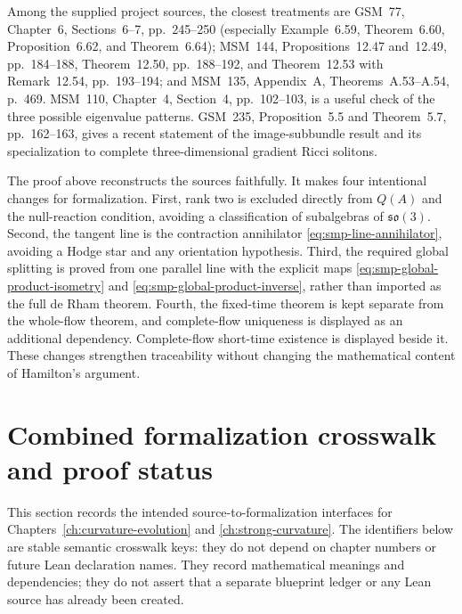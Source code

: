 \documentclass[10pt]{coll-l}
\theoremstyle{definition}
\theoremstyle{remark}
\numberwithin{section}{chapter}
\numberwithin{equation}{chapter}
\begin{document}
Among the supplied project sources, the closest treatments are GSM~77,
Chapter~6, Sections~6--7, pp.~245--250 (especially Example~6.59,
Theorem~6.60, Proposition~6.62, and Theorem~6.64); MSM~144,
Propositions~12.47 and~12.49, pp.~184--188, Theorem~12.50,
pp.~188--192, and Theorem~12.53 with Remark~12.54, pp.~193--194; and
MSM~135, Appendix~A, Theorems~A.53--A.54, p.~469.  MSM~110,
Chapter~4, Section~4, pp.~102--103, is a useful check of the three possible
eigenvalue patterns.  GSM~235, Proposition~5.5 and Theorem~5.7,
pp.~162--163, gives a recent statement of the image-subbundle result and its
specialization to complete three-dimensional gradient Ricci solitons.

The proof above reconstructs the sources faithfully.  It makes four
intentional changes for formalization.  First, rank two is excluded directly from
$Q(A)$ and the null-reaction condition, avoiding a classification of
subalgebras of $\mathfrak{so}(3)$.  Second, the tangent line is the
contraction annihilator \eqref{eq:smp-line-annihilator}, avoiding a Hodge
star and any orientation hypothesis.  Third, the required global splitting
is proved from one parallel line with the explicit maps
\eqref{eq:smp-global-product-isometry} and
\eqref{eq:smp-global-product-inverse}, rather than imported as the full de
Rham theorem.  Fourth, the fixed-time theorem is kept separate from the
whole-flow theorem, and complete-flow uniqueness is displayed as an
additional dependency.  Complete-flow short-time existence is displayed
beside it.  These changes strengthen traceability without
changing the mathematical content of Hamilton's argument.

\section{Combined formalization crosswalk and proof status}
\label{sec:strong-curvature-formalization}

This section records the intended source-to-formalization interfaces for
Chapters~\ref{ch:curvature-evolution} and
\ref{ch:strong-curvature}.  The identifiers below are stable semantic
crosswalk keys: they do not depend on chapter numbers or future Lean
declaration names.  They record mathematical meanings and dependencies;
they do not assert that a separate blueprint ledger or any Lean source has
already been created.
\end{document}
